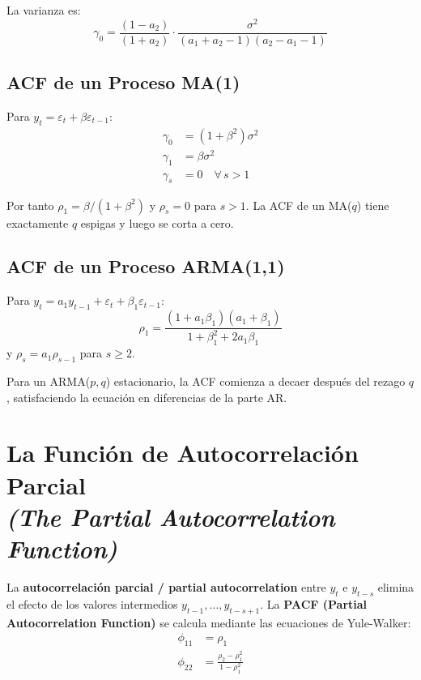 \documentclass[12pt]{article}
\begin{document}
La varianza es:
\begin{equation}
\gamma_0
  = \frac{(1-a_2)}{(1+a_2)}\cdot
    \frac{\sigma^2}{(a_1+a_2-1)(a_2-a_1-1)}
\end{equation}

\subsection{ACF de un Proceso MA(1)}

Para $y_t = \varepsilon_t + \beta\varepsilon_{t-1}$:
\begin{align}
\gamma_0 &= (1+\beta^2)\sigma^2 \\
\gamma_1 &= \beta\sigma^2 \\
\gamma_s &= 0 \quad \forall\, s > 1
\end{align}

Por tanto $\rho_1 = \beta/(1+\beta^2)$ y $\rho_s = 0$ para $s > 1$. La ACF de un MA($q$) tiene exactamente $q$ espigas y luego se corta a cero.

\subsection{ACF de un Proceso ARMA(1,1)}

Para $y_t = a_1 y_{t-1} + \varepsilon_t + \beta_1\varepsilon_{t-1}$:
\begin{equation}
\rho_1 = \frac{(1+a_1\beta_1)(a_1+\beta_1)}{1+\beta_1^2+2a_1\beta_1}
\end{equation}
y $\rho_s = a_1\rho_{s-1}$ para $s \ge 2$.

Para un ARMA($p,q$) estacionario, la ACF comienza a decaer despu\'es del rezago $q$, satisfaciendo la ecuaci\'on en diferencias de la parte AR.

\section{La Funci\'on de Autocorrelaci\'on Parcial\\
\textit{(The Partial Autocorrelation Function)}}

La \textbf{autocorrelaci\'on parcial / partial autocorrelation} entre $y_t$ e $y_{t-s}$ elimina el efecto de los valores intermedios $y_{t-1},\ldots,y_{t-s+1}$. La \textbf{PACF (Partial Autocorrelation Function)} se calcula mediante las ecuaciones de Yule-Walker:
\begin{align}
\phi_{11} &= \rho_1 \\
\phi_{22} &= \frac{\rho_2 - \rho_1^2}{1-\rho_1^2}
\end{align}
\end{document}
